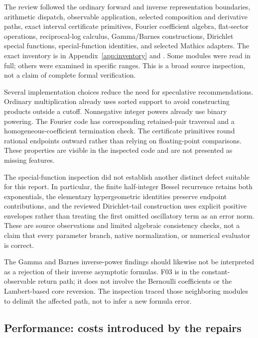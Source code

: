 \documentclass[11pt,letterpaper]{article}
\begin{document}
The review followed the ordinary forward and inverse representation boundaries, arithmetic dispatch, observable application, selected composition and derivative paths, exact interval certificate primitives, Fourier coefficient algebra, flat-sector operations, reciprocal-log calculus, Gamma/Barnes constructions, Dirichlet special functions, special-function identities, and selected Mathics adapters. The exact inventory is in Appendix~\ref{app:inventory} and . Some modules were read in full; others were examined in specific ranges. This is a broad source inspection, not a claim of complete formal verification.

Several implementation choices reduce the need for speculative recommendations. Ordinary multiplication already uses sorted support to avoid constructing products outside a cutoff. Nonnegative integer powers already use binary powering. The Fourier code has corresponding retained-pair traversal and a homogeneous-coefficient termination check. The certificate primitives round rational endpoints outward rather than relying on floating-point comparisons. These properties are visible in the inspected code and are not presented as missing features.\cite{core,fourier,certificates}

The special-function inspection did not establish another distinct defect suitable for this report. In particular, the finite half-integer Bessel recurrence retains both exponentials, the elementary hypergeometric identities preserve endpoint contributions, and the reviewed Dirichlet-tail construction uses explicit positive envelopes rather than treating the first omitted oscillatory term as an error norm. These are source observations and limited algebraic consistency checks, not a claim that every parameter branch, native normalization, or numerical evaluator is correct.\cite{identities,dirichlet,parameterized}

The Gamma and Barnes inverse-power findings should likewise not be interpreted as a rejection of their inverse asymptotic formulas. F03 is in the constant-observable return path; it does not involve the Bernoulli coefficients or the Lambert-based core reversion. The inspection traced those neighboring modules to delimit the affected path, not to infer a new formula error.\cite{gammainverse,barnesinverse,barnesforward,gammaops}

\subsection{Performance: costs introduced by the repairs}
\end{document}
